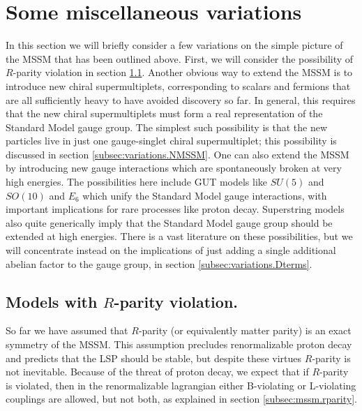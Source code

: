 \section{Some miscellaneous variations}\label{sec:variations}
\setcounter{equation}{0}
\setcounter{footnote}{1}

In this section we will briefly consider a few variations on the
simple picture of the MSSM that has been outlined above. First, we will 
consider
the possibility of $R$-parity violation
in section \ref{subsec:variations.Rparity}. Another obvious way to
extend the MSSM is to introduce new chiral supermultiplets,
corresponding to scalars and fermions that are all sufficiently heavy to
have avoided discovery so far. In general, this requires that the new
chiral supermultiplets must form a real representation of the Standard
Model gauge group. The simplest such possibility is that the new particles
live in just one gauge-singlet chiral supermultiplet; this
possibility is discussed in section \ref{subsec:variations.NMSSM}. One can
also extend the MSSM
by introducing new gauge interactions which are spontaneously broken
at very high energies. The possibilities here include GUT models
like $SU(5)$ and $SO(10)$ and $E_6$ which unify the Standard Model gauge
interactions, with important implications for rare processes like
proton decay. Superstring models also quite generically imply that
the Standard Model gauge group should be extended at high energies.
There is
a vast literature on these possibilities, but we will
concentrate instead on the implications of just adding a single
additional abelian factor to the gauge group, in section
\ref{subsec:variations.Dterms}.

\subsection{Models with $R$-parity
violation.}\label{subsec:variations.Rparity}

So far we have assumed that $R$-parity (or equivalently
matter parity) is an exact symmetry of the MSSM.
This assumption precludes renormalizable proton decay and
predicts that the LSP should be stable, but despite these virtues
$R$-parity is not inevitable.
Because of
the threat of proton decay, we expect that if $R$-parity is violated,
then in the renormalizable lagrangian either B-violating or L-violating
couplings are allowed, but not
both, as explained in section \ref{subsec:mssm.rparity}.

